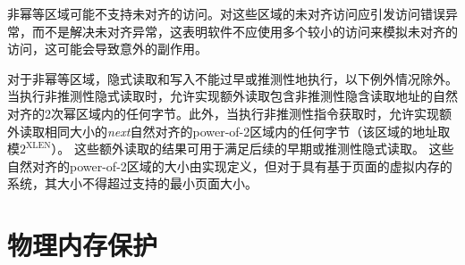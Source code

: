 {\iffalse
\begin{commentary}
Non-idempotent regions might not support misaligned accesses.  Misaligned
accesses to such regions should raise access-fault exceptions rather than
address-misaligned exceptions, indicating that software should not emulate the
misaligned access using multiple smaller accesses, which could cause
unexpected side effects.
\end{commentary}
\fi
\begin{commentary}
非幂等区域可能不支持未对齐的访问。对这些区域的未对齐访问应引发访问错误异常，而不是解决未对齐异常，这表明软件不应使用多个较小的访问来模拟未对齐的访问，这可能会导致意外的副作用。
\end{commentary}

\iffalse
For non-idempotent regions, implicit reads and writes must not be performed
early or speculatively, with the following exceptions.
When a non-speculative implicit read is performed, an implementation is
permitted to additionally read any of the bytes within a naturally aligned
power-of-2 region containing the address of the non-speculative implicit read.
Furthermore, when a non-speculative instruction fetch is performed, an
implementation is permitted to additionally read any of the bytes within the
{\em next} naturally aligned power-of-2 region of the same size (with the
address of the region taken modulo $2^{\text{XLEN}}$).
The results of these additional reads may be used to satisfy subsequent early
or speculative implicit reads.
The size of these naturally aligned power-of-2 regions is
implementation-defined, but, for systems with page-based virtual memory, must
not exceed the smallest supported page size.
\fi
对于非幂等区域，隐式读取和写入不能过早或推测性地执行，以下例外情况除外。当执行非推测性隐式读取时，允许实现额外读取包含非推测性隐含读取地址的自然对齐的2次幂区域内的任何字节。此外，当执行非推测性指令获取时，允许实现额外读取相同大小的{\em next}自然对齐的power-of-2区域内的任何字节（该区域的地址取模$2^{\text{XLEN}}$）。
这些额外读取的结果可用于满足后续的早期或推测性隐式读取。
这些自然对齐的power-of-2区域的大小由实现定义，但对于具有基于页面的虚拟内存的系统，其大小不得超过支持的最小页面大小。

\section{物理内存保护}
\label{sec:pmp}

}
